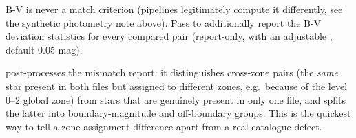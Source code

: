 B-V is never a match criterion (pipelines legitimately compute it
differently, see the synthetic photometry note above). Pass
 to additionally report the B-V deviation statistics
for every compared pair (report-only, with an adjustable
, default 0.05 mag).

 post-processes the mismatch report: it
distinguishes cross-zone pairs (the \emph{same} star present in both files
but assigned to different zones, e.g.\ because of the level 0--2 global
zone) from stars that are genuinely present in only one file, and splits
the latter into boundary-magnitude and off-boundary groups. This is the
quickest way to tell a zone-assignment difference apart from a real
catalogue defect.

